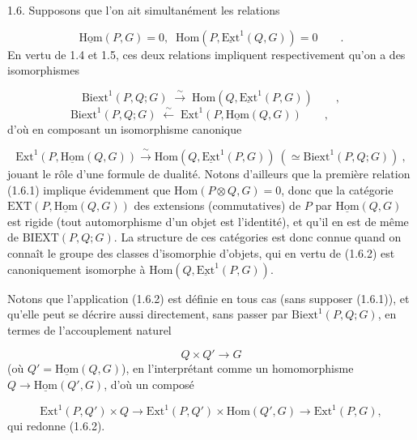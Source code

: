 1.6.  Supposons que l'on ait simultanément les relations

\begin{equation}\tag{1.6.1}
\underline{\mathrm{Hom}}(P,G) = 0, \;\; \mathrm{Hom}(P,\underline{\mathrm{Ext}}^1(Q,G)) = 0 \qquad .
\end{equation}
En vertu de 1.4 et 1.5, ces deux relations impliquent respectivement qu'on a des isomorphismes

\begin{equation*}
\mathrm{Biext}^1(P,Q;G) \;\stackrel{\sim}{\longrightarrow}\; \mathrm{Hom}(Q,\underline{\mathrm{Ext}}^1(P,G)) \qquad ,
\end{equation*}
\begin{equation*}
\mathrm{Biext}^1(P,Q;G) \;\stackrel{\sim}{\longleftarrow}\; \mathrm{Ext}^1(P,\underline{\mathrm{Hom}}(Q,G)) \qquad , \qquad 
\end{equation*}
 d'où en composant un isomorphisme canonique

\begin{equation}\tag{1.6.2}
\mathrm{Ext}^1(P,\underline{\mathrm{Hom}}(Q,G)) \xrightarrow{\ \sim\ } \mathrm{Hom}(Q,\underline{\mathrm{Ext}}^1(P,G)) \ ( \simeq \mathrm{Biext}^1(P,Q;G)) \ ,
\end{equation}
jouant le rôle d'une formule de dualité. Notons d'ailleurs que la première relation (1.6.1) implique évidemment que $\mathrm{Hom}(P \otimes Q,G) = 0$, donc que la catégorie $\mathrm{EXT}(P,\underline{\mathrm{Hom}}(Q,G))$ des extensions (commutatives) de $P$ par $\underline{\mathrm{Hom}}(Q,G)$ est rigide (tout automorphisme d'un objet est l'identité), et qu'il en est de même de $\mathrm{BIEXT}(P,Q;G)$. La structure de ces catégories est donc connue quand on connaît le groupe des classes d'isomorphie d'objets, qui en vertu de (1.6.2) est canoniquement isomorphe à $\mathrm{Hom}(Q,\underline{\mathrm{Ext}}^1(P,G))$.

Notons que l'application (1.6.2) est définie en tous cas (sans supposer (1.6.1)), et qu'elle peut se décrire aussi directement, sans passer par $\mathrm{Biext}^1(P,Q;G)$, en termes de l'accouplement naturel

\begin{equation*}
Q \times Q' \longrightarrow G
\end{equation*}
(où $Q' = \underline{\mathrm{Hom}}(Q,G)$), en l'interprétant comme un homomorphisme $Q \to \underline{\mathrm{Hom}}(Q',G)$, d'où un composé

\begin{equation}\tag{1.6.3}
\mathrm{Ext}^1(P,Q') \times Q \to \mathrm{Ext}^1(P,Q') \times \mathrm{Hom}(Q',G) \longrightarrow \mathrm{Ext}^1(P,G),
\end{equation}
qui redonne (1.6.2).

